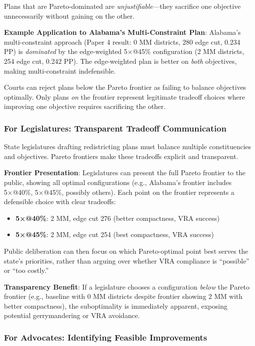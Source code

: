Plans that are Pareto-dominated are \emph{unjustifiable}---they sacrifice one objective unnecessarily without gaining on the other.

\textbf{Example Application to Alabama's Multi-Constraint Plan}: Alabama's multi-constraint approach (Paper 4 result: 0 MM districts, 280 edge cut, 0.234 PP) is \emph{dominated} by the edge-weighted 5×@45\% configuration (2 MM districts, 254 edge cut, 0.242 PP). The edge-weighted plan is better on \emph{both} objectives, making multi-constraint indefensible.

Courts can reject plans below the Pareto frontier as failing to balance objectives optimally. Only plans \emph{on} the frontier represent legitimate tradeoff choices where improving one objective requires sacrificing the other.

\subsubsection{For Legislatures: Transparent Tradeoff Communication}

State legislatures drafting redistricting plans must balance multiple constituencies and objectives. Pareto frontiers make these tradeoffs explicit and transparent.

\textbf{Frontier Presentation}: Legislatures can present the full Pareto frontier to the public, showing all optimal configurations (e.g., Alabama's frontier includes 5×@40\%, 5×@45\%, possibly others). Each point on the frontier represents a defensible choice with clear tradeoffs:
\begin{itemize}
    \item \textbf{5×@40\%}: 2 MM, edge cut 276 (better compactness, VRA success)
    \item \textbf{5×@45\%}: 2 MM, edge cut 254 (best compactness, VRA success)
\end{itemize}

Public deliberation can then focus on which Pareto-optimal point best serves the state's priorities, rather than arguing over whether VRA compliance is ``possible'' or ``too costly.''

\textbf{Transparency Benefit}: If a legislature chooses a configuration \emph{below} the Pareto frontier (e.g., baseline with 0 MM districts despite frontier showing 2 MM with better compactness), the suboptimality is immediately apparent, exposing potential gerrymandering or VRA avoidance.

\subsubsection{For Advocates: Identifying Feasible Improvements}

